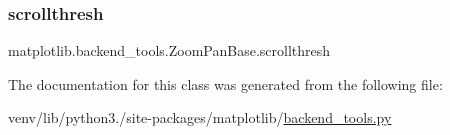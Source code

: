 \mbox{\label{classmatplotlib_1_1backend__tools_1_1ZoomPanBase_acefd868658c8371a307422acf841f741}} 
\subsubsection{\texorpdfstring{scrollthresh}{scrollthresh}}
{\footnotesize\ttfamily matplotlib.\+backend\+\_\+tools.\+Zoom\+Pan\+Base.\+scrollthresh}



The documentation for this class was generated from the following file\+:\begin{DoxyCompactItemize}
\item 
venv/lib/python3./site-\/packages/matplotlib/\hyperlink{backend__tools_8py}{backend\+\_\+tools.\+py}\end{DoxyCompactItemize}
